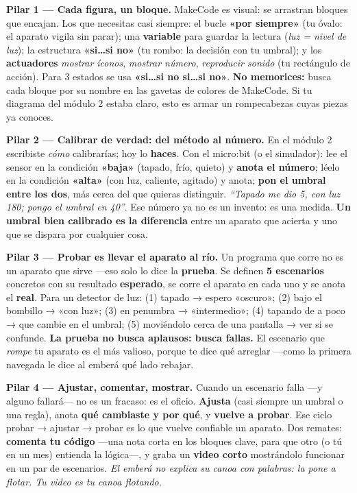 \documentclass[11pt,letterpaper]{article}
\newcommand{\milcpaso}[3]{%
\Needspace{4\baselineskip}%
\begin{tcolorbox}[enhanced,colback=white,colframe=milcLinea,arc=1.5mm,boxrule=.9pt,
  left=14mm,right=4mm,top=3mm,bottom=3mm,before skip=4pt,after skip=4pt,
  fontupper=\RaggedRight,
  overlay={\node[anchor=north west,circle,fill=#2,text=white,inner sep=0pt,
    minimum size=7.4mm,font=\sffamily\bfseries\small]
    at ([xshift=3.6mm,yshift=-3.2mm]frame.north west) {#1};}]
#3
\end{tcolorbox}}
\begin{document}
\milcpaso{1}{milcTurquesa}{\textbf{Pilar 1 --- Cada figura, un bloque.} MakeCode es visual: se arrastran bloques que encajan. Los que necesitas casi siempre: el bucle \textbf{«por siempre»} (tu óvalo: el aparato vigila sin parar); una \textbf{variable} para guardar la lectura (\emph{luz = nivel de luz}); la estructura \textbf{«si\ldots si no»} (tu rombo: la decisión con tu umbral); y los \textbf{actuadores} \emph{mostrar íconos}, \emph{mostrar número}, \emph{reproducir sonido} (tu rectángulo de acción). Para 3 estados se usa \textbf{«si\ldots si no si\ldots si no»}. \textbf{No memorices:} busca cada bloque por su nombre en las gavetas de colores de MakeCode. Si tu diagrama del módulo 2 estaba claro, esto es armar un rompecabezas cuyas piezas ya conoces.}
\milcpaso{2}{milcTurquesa}{\textbf{Pilar 2 --- Calibrar de verdad: del método al número.} En el módulo 2 escribiste \emph{cómo} calibrarías; hoy lo \textbf{haces}. Con el micro:bit (o el simulador): lee el sensor en la condición \textbf{«baja»} (tapado, frío, quieto) y \textbf{anota el número}; léelo en la condición \textbf{«alta»} (con luz, caliente, agitado) y anota; \textbf{pon el umbral entre los dos}, más cerca del que quieras distinguir. \emph{``Tapado me dio 5, con luz 180; pongo el umbral en 40''}. Ese número ya no es un invento: es una medida. \textbf{Un umbral bien calibrado es la diferencia} entre un aparato que acierta y uno que se dispara por cualquier cosa.}
\milcpaso{3}{milcTurquesa}{\textbf{Pilar 3 --- Probar es llevar el aparato al río.} Un programa que corre no es un aparato que sirve ---eso solo lo dice la \textbf{prueba}. Se definen \textbf{5 escenarios} concretos con su resultado \textbf{esperado}, se corre el aparato en cada uno y se anota el \textbf{real}. Para un detector de luz: (1) tapado → espero «oscuro»; (2) bajo el bombillo → «con luz»; (3) en penumbra → «intermedio»; (4) tapando de a poco → que cambie en el umbral; (5) moviéndolo cerca de una pantalla → ver si se confunde. \textbf{La prueba no busca aplausos: busca fallas.} El escenario que \emph{rompe} tu aparato es el más valioso, porque te dice qué arreglar ---como la primera navegada le dice al emberá qué lado rebajar.}
\milcpaso{4}{milcTurquesa}{\textbf{Pilar 4 --- Ajustar, comentar, mostrar.} Cuando un escenario falla ---y alguno fallará--- no es un fracaso: es el oficio. \textbf{Ajusta} (casi siempre un umbral o una regla), anota \textbf{qué cambiaste y por qué}, y \textbf{vuelve a probar}. Ese ciclo probar → ajustar → probar es lo que vuelve confiable un aparato. Dos remates: \textbf{comenta tu código} ---una nota corta en los bloques clave, para que otro (o tú en un mes) entienda la lógica---, y graba un \textbf{video corto} mostrándolo funcionar en un par de escenarios. \emph{El emberá no explica su canoa con palabras: la pone a flotar. Tu video es tu canoa flotando.}}
\end{document}
